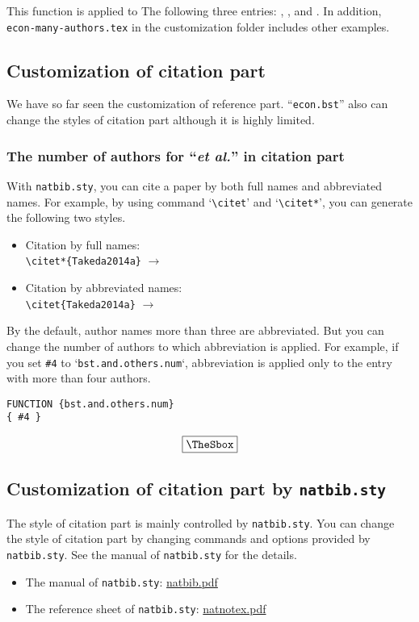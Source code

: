 \documentclass[10pt]{article}
\newenvironment{Frame}%
{\setlength{\fboxsep}{15pt}
\setlength{\mylength}{\linewidth}%
\addtolength{\mylength}{-2\fboxsep}%
\addtolength{\mylength}{-2\fboxrule}%
\Sbox
\minipage{\mylength}%
\setlength{\abovedisplayskip}{0pt}%
\setlength{\belowdisplayskip}{0pt}%
}%
{\endminipage\endSbox
\[\fbox{\TheSbox}\]}
\begin{document}
This function is applied to The following three entries:
\citet{essd-10-405-2018}, \citet{luthi08:_high}, and
\citet{doi:10.1175/2009BAMS2778.1}. In addition, \texttt{econ-many-authors.tex}
in the customization folder includes other examples.


\subsection{Customization of citation part}

We have so far seen the customization of reference part. ``\texttt{econ.bst}''
also can change the styles of citation part although it is highly limited.

\subsubsection{The number of authors for ``\textit{et al.}'' in citation part}

With \texttt{natbib.sty}, you can cite a paper by both full names and
abbreviated names. For example, by using command `\verb|\citet|' and
`\verb|\citet*|', you can generate the following two styles.
\begin{itemize}
 \item Citation by full names: \\
       \verb|\citet*{Takeda2014a}| $\longrightarrow$ \citet*{Takeda2014a}
 \item Citation by abbreviated names: \\
       \verb|\citet{Takeda2014a}| $\longrightarrow$ \citet{Takeda2014a}
\end{itemize}

By the default, author names more than three are abbreviated. But you can change
the number of authors to which abbreviation is applied.  For example, if you set
\verb|#4| to `\texttt{bst.and.others.num}`, abbreviation is applied only to the
entry with more than four authors.
\begin{Frame}
\begin{verbatim}
FUNCTION {bst.and.others.num}
{ #4 }
\end{verbatim} 
\end{Frame}

\subsection{Customization of citation part by \texttt{natbib.sty}}

The style of citation part is mainly controlled by \texttt{natbib.sty}. You can
change the style of citation part by changing commands and options provided by
\texttt{natbib.sty}.
See the manual of \texttt{natbib.sty} for the details. 
\begin{itemize}
 \item The manual of \texttt{natbib.sty}:
       \href{http://mirror.ctan.org/macros/latex/contrib/natbib/natbib.pdf}{natbib.pdf}
 \item The reference sheet of \texttt{natbib.sty}:
       \href{http://mirror.ctan.org/macros/latex/contrib/natbib/natnotes.pdf}{natnotex.pdf}
\end{itemize}
\end{document}
